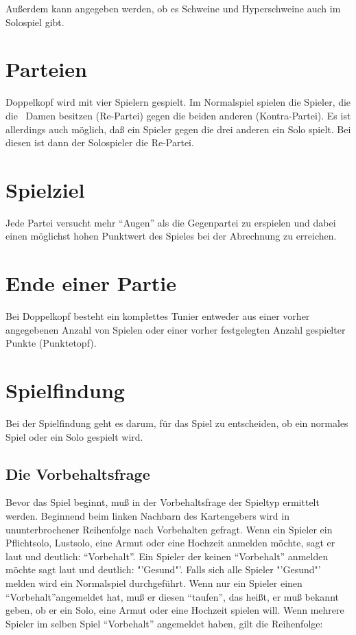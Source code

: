 \documentclass{scrartcl}
\begin{document}
Außerdem kann angegeben werden, ob es Schweine und Hyperschweine auch im Solospiel gibt.

\section{Parteien}
Doppelkopf wird mit vier Spielern gespielt. Im Normalspiel spielen die Spieler, die die \Kreuz\ Damen besitzen (Re-Partei) gegen die beiden anderen (Kontra-Partei). Es ist allerdings auch möglich, daß ein Spieler gegen die drei anderen ein Solo spielt.  Bei diesen ist dann der Solospieler die Re-Partei.

\section{Spielziel}
Jede Partei versucht mehr "`Augen"' als die Gegenpartei zu erspielen und dabei einen möglichst hohen Punktwert des Spieles bei der Abrechnung zu erreichen.

\section{Ende einer Partie}
Bei Doppelkopf besteht ein komplettes Tunier entweder aus einer vorher angegebenen Anzahl von Spielen oder einer vorher festgelegten Anzahl gespielter Punkte (Punktetopf).

\section{Spielfindung}
Bei der Spielfindung geht es darum, für das Spiel zu entscheiden, ob ein normales Spiel oder ein Solo gespielt wird.

\subsection{Die Vorbehaltsfrage}
Bevor das Spiel beginnt, muß in der Vorbehaltsfrage der Spieltyp ermittelt werden. Beginnend beim linken Nachbarn des Kartengebers wird in ununterbrochener Reihenfolge nach Vorbehalten gefragt.  Wenn ein Spieler ein Pflichtsolo, Lustsolo, eine Armut oder eine Hochzeit anmelden möchte, sagt er laut und deutlich: "`Vorbehalt"'. Ein Spieler der keinen "`Vorbehalt"' anmelden möchte sagt laut und deutlich: "'Gesund"'. Falls sich alle Spieler "'Gesund"' melden wird ein Normalspiel durchgeführt.  Wenn nur ein Spieler einen "`Vorbehalt"'angemeldet hat, muß er diesen "`taufen"', das heißt, er muß bekannt geben, ob er ein Solo, eine Armut oder eine Hochzeit spielen will. Wenn mehrere Spieler im selben Spiel "`Vorbehalt"' angemeldet haben, gilt die Reihenfolge:
\end{document}
